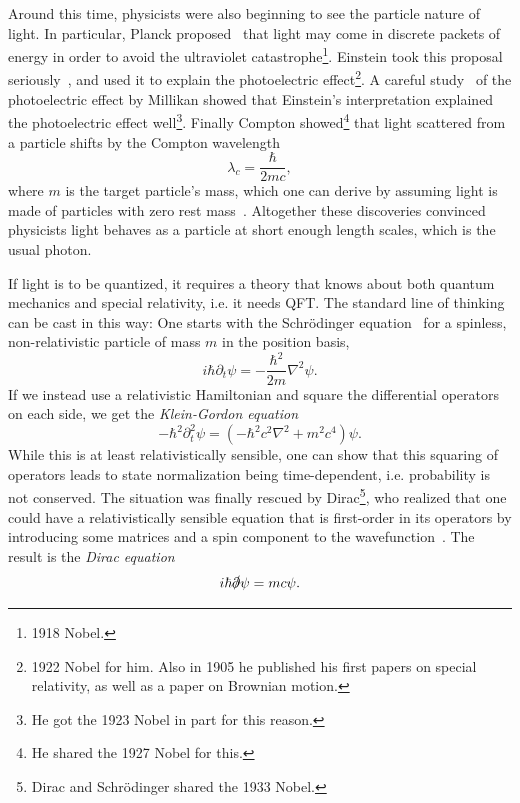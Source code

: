 Around this time, physicists were also beginning to see the particle nature of
light. In particular, Planck proposed~\cite{Planck:1901tja} 
that light may come in discrete packets of
energy in order to avoid the ultraviolet 
catastrophe\footnote{1918 Nobel.}.
Einstein took this proposal seriously~\cite{Einstein:1905cc}, 
and used it to explain the photoelectric
effect\footnote{1922 Nobel for him. Also in 1905 he published his first
papers on special relativity, as well as a paper on Brownian motion.}. 
A careful study~\cite{millikan_direct_1916} of the photoelectric effect by 
Millikan showed that
Einstein's interpretation explained the photoelectric effect well\footnote{He
got the 1923 Nobel in part for this reason.}. Finally
Compton showed\footnote{He shared the 1927 Nobel for this.} 
that light scattered from a particle shifts by the Compton
wavelength
\begin{equation}
  \lambda_c=\frac{\hbar}{2mc},
\end{equation}
where $m$ is the target particle's mass, which one can derive by assuming light
is made of particles with zero rest mass~\cite{Compton:1923zz}.
Altogether these discoveries convinced physicists light behaves as a particle
at short enough length scales, which is the usual photon.


If light is to be quantized, it requires a theory that knows about both quantum
mechanics and special relativity, i.e. it needs QFT. 
The standard line of thinking can be cast in this way: One starts with
the Schr\"odinger 
equation~\cite{Schrodinger:1926gei,Schrodinger:1926vbi,Schrodinger:1926qnk,Schrodinger:1926xyk}
for a spinless, non-relativistic particle
of mass $m$ in the position basis,
\begin{equation}
i\hbar\partial_t\psi=-\frac{\hbar^2}{2m}\nabla^2\psi.
\end{equation}
If we instead use a relativistic Hamiltonian and square the differential
operators on each side, we get the 
{\it Klein-Gordon equation}~\cite{Klein:1926tv,gordon_comptoneffekt_1926}
\begin{equation}
-\hbar^2\partial_t^2\psi=\left(-\hbar^2c^2\nabla^2+m^2c^4\right)\psi.
\end{equation} 
While this is at least relativistically sensible, one can show that this
squaring of operators
leads to state normalization being time-dependent, i.e. probability is not
conserved. The situation was finally rescued by Dirac\footnote{Dirac
and Schr\"odinger shared the 1933 Nobel.}, who realized that
one could have a relativistically sensible equation that is first-order
in its operators by introducing some matrices and a spin component
to the wavefunction~\cite{Dirac:1928hu,Dirac:1928ej}. The result is the 
{\it Dirac equation}
\begin{equation}
i\hbar\slashed{\partial}\psi=mc\psi.
\end{equation}

